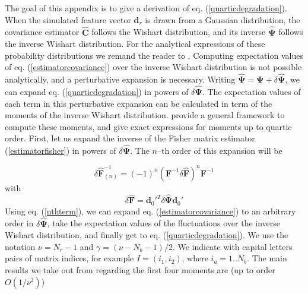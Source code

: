 \documentclass[reprint,aps,prd,superscriptaddress,showkeys,showpacs]{revtex4-1}
\newcommand{\bb}[1]{\mathbf{#1}}
\newcommand{\bbh}[1]{\mathbf{\hat{#1}}}
\begin{document}
The goal of this appendix is to give a derivation of eq. (\ref{quarticdegradation}). When the simulated feature vector $\bbh{d}_r$ is drawn from a Gaussian distribution, the covariance estimator $\bbh{C}$ follows the Wishart distribution, and its inverse $\bbh{\Psi}$ follows the inverse Wishart distribution. For the analytical expressions of these probability distributions we remand the reader to \citep{Taylor12}. Computing expectation values of eq. (\ref{estimatorcovariance}) over the inverse Wishart distribution is not possible analytically, and a perturbative expansion is necessary. Writing $\bbh{\Psi}=\bb{\Psi}+\delta\bbh{\Psi}$, we can expand eq. (\ref{quarticdegradation}) in powers of $\delta\bbh{\Psi}$. The expectation values of each term in this perturbative expansion can be calculated in term of the moments of the inverse Wishart distribution. \citep{MasumotoWishart} provide a general framework to compute these moments, and give exact expressions for moments up to quartic order. First, let us expand the inverse of the Fisher matrix estimator (\ref{estimatorfisher}) in powers of $\delta\bbh{\Psi}$. The $n$--th order of this expansion will be 

\begin{equation}
\label{nthterm}
\delta\bbh{F}^{-1}_{(n)} = (-1)^{n}(\bb{F}^{-1}\delta\bbh{F})^n\bb{F}^{-1}
\end{equation}
%
with
\begin{equation}
\delta\bbh{F} = \bb{d}_0'^T\delta\bbh{\Psi}\bb{d}_0'
\end{equation}
%
Using eq. (\ref{nthterm}), we can expand eq. (\ref{estimatorcovariance}) to an arbitrary order in $\delta\bbh{\Psi}$, take the expectation values of the fluctuations over the inverse Wishart distribution, and finally get to eq. (\ref{quarticdegradation}). We use the notation $\nu=N_r-1$ and $\gamma=(\nu-N_b-1)/2$. We indicate with capital letters pairs of matrix indices, for example $I=(i_1,i_2)$, where $i_a=1..N_b$. The main results we take out from \citep{MasumotoWishart} regarding the first four moments are (up to order $O(1/\nu^2)$)
\end{document}

